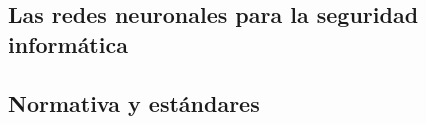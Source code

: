 
\subsection{Las redes neuronales para la seguridad informática}






\subsection{Normativa y estándares}














